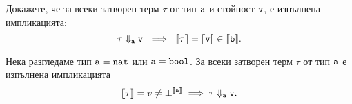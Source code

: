 
\begin{theorem}
  Докажете, че за всеки затворен терм $\tau$ от тип $\texttt{a}$ и стойност $\texttt{v}$, е изпълнена импликацията:
  \[\tau \Downarrow_{\vv{a}} \vv{v}\ \implies\ \val{\tau} = \val{\vv{v}} \in \val{\vv{b}}.\]
\end{theorem}

\begin{theorem}
  Нека разгледаме тип $\texttt{a} = \texttt{nat}$ или $\texttt{a} = \texttt{bool}$.
  За всеки затворен терм $\tau$ от тип $\texttt{a}$ е изпълнена импликацията
  \[\llbracket{\tau}\rrbracket = v \neq \bot^{\llbracket{\texttt{a}}\rrbracket} \implies \tau \Downarrow_{\texttt{a}} \texttt{v}.\]
\end{theorem}


